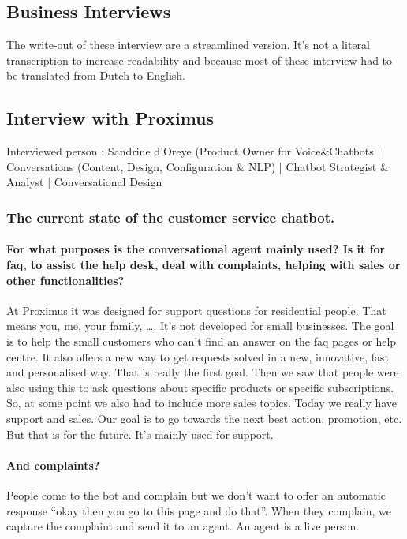 \begin{appendices}
	\chapter{Business Interviews}
	\label{ch:appendices}
	The write-out of these interview are a streamlined version. It's not a literal transcription to increase readability and because most of these interview had to be translated from Dutch to English.
	
	\section{Interview with Proximus}
	\label{in:Proximus}
	Interviewed person : Sandrine d'Oreye (Product Owner for Voice\&Chatbots | Conversations (Content, Design, Configuration \& NLP) | Chatbot Strategist \& Analyst | Conversational Design
	\subsection{The current state of the customer service chatbot.}
	\subsubsection{For what purposes is the conversational agent mainly used? Is it for \acrshort{faq}, to assist the help desk, deal with complaints, helping with sales or other functionalities?}
	At Proximus it was designed for support questions for residential people. That means you, me, your family, …. It’s not developed for small businesses. The goal is to help the small customers who can’t find an answer on the \acrshort{faq} pages or help centre. It also offers a new way to get requests solved in a new, innovative, fast and personalised way. That is really the first goal. Then we saw that people were also using this to ask questions about specific products or specific subscriptions. So, at some point we also had to include more sales topics. Today we really have support and sales. Our goal is to go towards the next best action, promotion, etc. But that is for the future. It’s mainly used for support.
	
	\subsubsection{And complaints?}
	People come to the bot and complain but we don’t want to offer an automatic response “okay then you go to this page and do that”. When they complain, we capture the complaint and send it to an agent. An agent is a live person.
	

\end{appendices}
